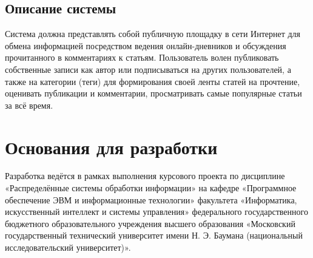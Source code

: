 \documentclass{bmstu-gost-7-32}
\begin{document}
\subsection{Описание системы}

Система должна представлять собой публичную площадку в сети Интернет для обмена информацией посредством ведения онлайн-дневников и обсуждения прочитанного в комментариях к статьям.
Пользователь волен публиковать собственные записи как автор или подписываться на других пользователей, а также на категории (теги) для формирования своей ленты статей на прочтение, оценивать публикации и комментарии, просматривать самые популярные статьи за всё время.


\section{Основания для разработки}



Разработка ведётся в рамках выполнения курсового проекта по дисциплине «Распределённые системы обработки информации» на кафедре «Программное обеспечение ЭВМ и информационные технологии» факультета «Информатика, искусственный интеллект и системы управления» федерального государственного бюджетного образовательного учреждения высшего образования «Московский государственный технический университет имени Н. Э. Баумана (национальный исследовательский университет)».
\end{document}
